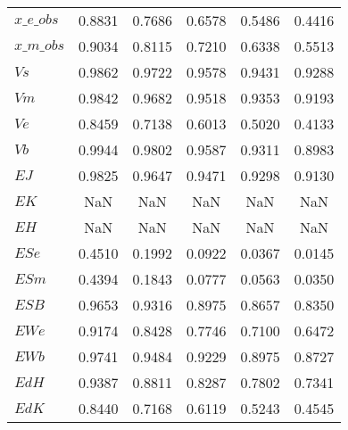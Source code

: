 \begin{center}
\begin{longtable}{lccccc}
$x\_e\_obs                  $	 & 	        0.8831	 & 	        0.7686	 & 	        0.6578	 & 	        0.5486	 & 	        0.4416 \\ 
$x\_m\_obs                  $	 & 	        0.9034	 & 	        0.8115	 & 	        0.7210	 & 	        0.6338	 & 	        0.5513 \\ 
$Vs                         $	 & 	        0.9862	 & 	        0.9722	 & 	        0.9578	 & 	        0.9431	 & 	        0.9288 \\ 
$Vm                         $	 & 	        0.9842	 & 	        0.9682	 & 	        0.9518	 & 	        0.9353	 & 	        0.9193 \\ 
$Ve                         $	 & 	        0.8459	 & 	        0.7138	 & 	        0.6013	 & 	        0.5020	 & 	        0.4133 \\ 
$Vb                         $	 & 	        0.9944	 & 	        0.9802	 & 	        0.9587	 & 	        0.9311	 & 	        0.8983 \\ 
$EJ                         $	 & 	        0.9825	 & 	        0.9647	 & 	        0.9471	 & 	        0.9298	 & 	        0.9130 \\ 
$EK                         $	 & 	           NaN	 & 	           NaN	 & 	           NaN	 & 	           NaN	 & 	           NaN \\ 
$EH                         $	 & 	           NaN	 & 	           NaN	 & 	           NaN	 & 	           NaN	 & 	           NaN \\ 
$ESe                        $	 & 	        0.4510	 & 	        0.1992	 & 	        0.0922	 & 	        0.0367	 & 	        0.0145 \\ 
$ESm                        $	 & 	        0.4394	 & 	        0.1843	 & 	        0.0777	 & 	        0.0563	 & 	        0.0350 \\ 
$ESB                        $	 & 	        0.9653	 & 	        0.9316	 & 	        0.8975	 & 	        0.8657	 & 	        0.8350 \\ 
$EWe                        $	 & 	        0.9174	 & 	        0.8428	 & 	        0.7746	 & 	        0.7100	 & 	        0.6472 \\ 
$EWb                        $	 & 	        0.9741	 & 	        0.9484	 & 	        0.9229	 & 	        0.8975	 & 	        0.8727 \\ 
$EdH                        $	 & 	        0.9387	 & 	        0.8811	 & 	        0.8287	 & 	        0.7802	 & 	        0.7341 \\ 
$EdK                        $	 & 	        0.8440	 & 	        0.7168	 & 	        0.6119	 & 	        0.5243	 & 	        0.4545 \\ 

\end{longtable}
\end{center}
